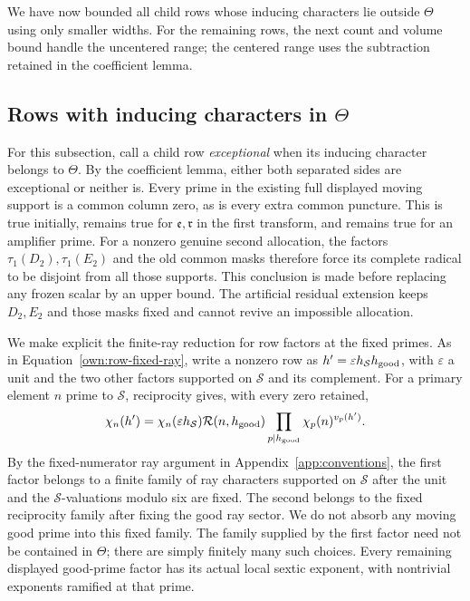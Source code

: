 \documentclass[12pt]{article}
\begin{document}
We have now bounded all child rows whose inducing characters lie outside
\(\Theta\) using only smaller widths.  For the remaining rows, the next
count and volume bound handle the uncentered range; the centered range
uses the subtraction retained in the coefficient lemma.

\subsection{Rows with inducing characters in \texorpdfstring{\(\Theta\)}{Theta}}

For this subsection, call a child row \emph{exceptional} when its
inducing character belongs to \(\Theta\).  By the coefficient
lemma, either both separated sides are exceptional or neither is.
Every prime in the existing full displayed moving support is a common
column zero, as is every extra common puncture.  This is true initially,
remains true for \(\mathfrak e,\mathfrak r\) in the first transform,
and remains true for an amplifier prime.  For a nonzero genuine
second allocation, the factors \(\tau_1(D_2),\tau_1(E_2)\) and the
old common masks therefore force its complete radical to be disjoint
from all those supports.  This conclusion is made before replacing
any frozen scalar by an upper bound.  The artificial residual
extension keeps \(D_2,E_2\) and those masks fixed and cannot revive
an impossible allocation.

We make explicit the finite-ray reduction for row factors at the fixed
primes.  As in Equation~\eqref{own:row-fixed-ray}, write a nonzero row as
\(h'=\varepsilon h_{\mathcal S}h_{\rm good}\), with
\(\varepsilon\) a unit and the two other factors supported on
\(\mathcal S\) and its complement.  For a primary element \(n\)
prime to \(\mathcal S\), reciprocity gives, with every zero retained,
\[
 \chi_n(h')=\chi_n(\varepsilon h_{\mathcal S})
   \mathcal R(n,h_{\rm good})
   \prod_{p\mid h_{\rm good}}\chi_p(n)^{v_p(h')}.
\]
By the fixed-numerator ray argument in Appendix~\ref{app:conventions}, the first factor belongs to
a finite family of ray characters supported on \(\mathcal S\) after
the unit and the \(\mathcal S\)-valuations modulo six are fixed.
The second belongs to the fixed reciprocity family after fixing the
good ray sector.  We do not absorb any moving good prime into this
fixed family.  The family supplied by the first factor need not be
contained in \(\Theta\); there are simply finitely many such choices.
Every remaining displayed good-prime factor has its actual local
sextic exponent, with nontrivial exponents ramified at that prime.
\end{document}
